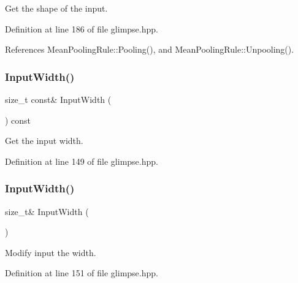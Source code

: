 Get the shape of the input. 



Definition at line 186 of file glimpse.\+hpp.



References Mean\+Pooling\+Rule\+::\+Pooling(), and Mean\+Pooling\+Rule\+::\+Unpooling().

\mbox{\label{classmlpack_1_1ann_1_1Glimpse_a29346e3064da8f9e5f10596bedae0ba8}} 
\subsubsection{Input\+Width()\hspace{0.1cm}{\footnotesize\ttfamily [1/2]}}
{\footnotesize\ttfamily size\+\_\+t const\& Input\+Width (\begin{DoxyParamCaption}{ }\end{DoxyParamCaption}) const\hspace{0.3cm}{\ttfamily [inline]}}



Get the input width. 



Definition at line 149 of file glimpse.\+hpp.

\mbox{\label{classmlpack_1_1ann_1_1Glimpse_a238e9d308df611a9300a4ca6756fef4d}} 
\subsubsection{Input\+Width()\hspace{0.1cm}{\footnotesize\ttfamily [2/2]}}
{\footnotesize\ttfamily size\+\_\+t\& Input\+Width (\begin{DoxyParamCaption}{ }\end{DoxyParamCaption})\hspace{0.3cm}{\ttfamily [inline]}}



Modify input the width. 



Definition at line 151 of file glimpse.\+hpp.

\mbox{\label{classmlpack_1_1ann_1_1Glimpse_adc2669016a821704c4c4aeb4651e9e87}} 
